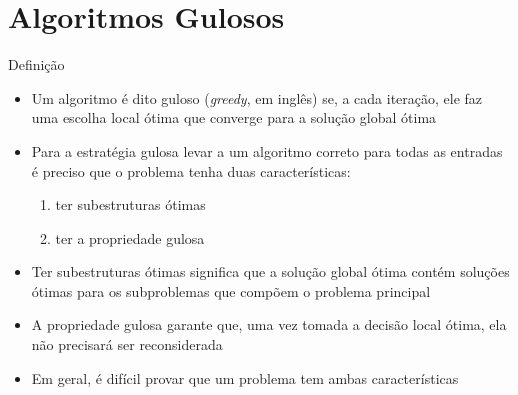 \section{Algoritmos Gulosos}

\begin{frame}[fragile]{Definição}

    \begin{itemize}
        \item Um algoritmo é dito guloso (\textit{greedy}, em inglês) se, a cada iteração,
            ele faz uma escolha local ótima que converge para a solução global ótima

        \item Para a estratégia gulosa levar a um algoritmo correto para todas as entradas
            é preciso que o problema tenha duas características:

        \begin{enumerate}
            \item ter subestruturas ótimas
            \item ter a propriedade gulosa
        \end{enumerate}

        \item Ter  subestruturas ótimas significa que a solução global ótima contém soluções
            ótimas para os subproblemas que compõem o problema principal

        \item A propriedade gulosa garante que, uma vez tomada a decisão local ótima, ela não
            precisará ser reconsiderada 

        \item Em geral, é difícil provar que um problema tem ambas características
    \end{itemize}

\end{frame}

